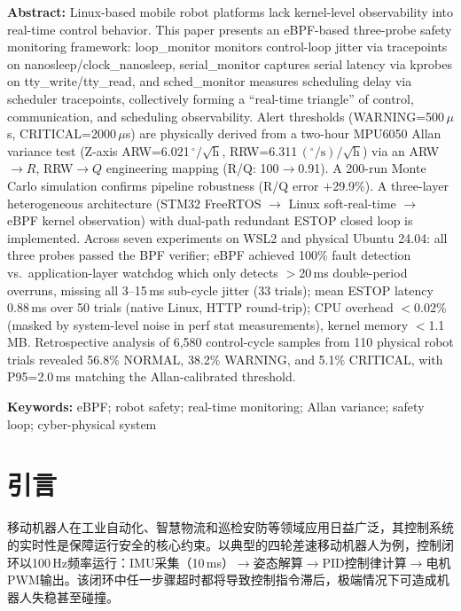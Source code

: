 \documentclass{rjthesis}
\begin{document}
{\xiaowuhao
\noindent\textbf{Abstract:} Linux-based mobile robot platforms lack kernel-level observability into real-time control behavior. This paper presents an eBPF-based three-probe safety monitoring framework: loop\_monitor monitors control-loop jitter via tracepoints on nanosleep/clock\_nanosleep, serial\_monitor captures serial latency via kprobes on tty\_write/tty\_read, and sched\_monitor measures scheduling delay via scheduler tracepoints, collectively forming a ``real-time triangle'' of control, communication, and scheduling observability. Alert thresholds (WARNING=500\,$\mu$s, CRITICAL=2000\,$\mu$s) are physically derived from a two-hour MPU6050 Allan variance test (Z-axis ARW=6.021\,$^{\circ}/\sqrt{\mathrm{h}}$, RRW=6.311\,$(^{\circ}/\mathrm{s})/\sqrt{\mathrm{h}}$) via an ARW$\to R$, RRW$\to Q$ engineering mapping (R/Q: 100$\to$0.91). A 200-run Monte Carlo simulation confirms pipeline robustness (R/Q error $+$29.9\%). A three-layer heterogeneous architecture (STM32 FreeRTOS $\to$ Linux soft-real-time $\to$ eBPF kernel observation) with dual-path redundant ESTOP closed loop is implemented. Across seven experiments on WSL2 and physical Ubuntu 24.04: all three probes passed the BPF verifier; eBPF achieved 100\% fault detection vs.\ application-layer watchdog which only detects $>$20\,ms double-period overruns, missing all 3--15\,ms sub-cycle jitter (33 trials); mean ESTOP latency 0.88\,ms over 50 trials (native Linux, HTTP round-trip); CPU overhead $<$0.02\% (masked by system-level noise in perf stat measurements), kernel memory $<$1.1\,MB. Retrospective analysis of 6,580 control-cycle samples from 110 physical robot trials revealed 56.8\% NORMAL, 38.2\% WARNING, and 5.1\% CRITICAL, with P95=2.0\,ms matching the Allan-calibrated threshold.

\vspace{0.5em}
\noindent\textbf{Keywords:} eBPF; robot safety; real-time monitoring; Allan variance; safety loop; cyber-physical system
\par}

\section{引言}

移动机器人在工业自动化、智慧物流和巡检安防等领域应用日益广泛，其控制系统的实时性是保障运行安全的核心约束。以典型的四轮差速移动机器人为例，控制闭环以100\,Hz频率运行：IMU采集（10\,ms）$\to$姿态解算$\to$PID控制律计算$\to$电机PWM输出。该闭环中任一步骤超时都将导致控制指令滞后，极端情况下可造成机器人失稳甚至碰撞。
\end{document}
